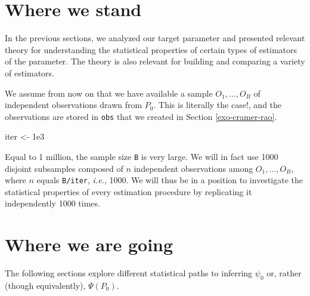 \documentclass[11pt,openright,twoside]{book}
\newenvironment{Shaded}{\begin{snugshade}}{\end{snugshade}}
\newcommand{\FloatTok}[1]{\textcolor[rgb]{0.00,0.00,0.81}{#1}}
\newcommand{\NormalTok}[1]{#1}
\newcommand{\StringTok}[1]{\textcolor[rgb]{0.31,0.60,0.02}{#1}}
\theoremstyle{definition}
\theoremstyle{definition}
\theoremstyle{definition}
\theoremstyle{remark}
\begin{document}
\hypertarget{where-we-stand}{%
\section{Where we stand}\label{where-we-stand}}

In the previous sections, we analyzed our target parameter and presented
relevant theory for understanding the statistical properties of certain types
of estimators of the parameter. The theory is also relevant for building and
comparing a variety of estimators.

We assume from now on that we have available a sample \(O_{1}, \ldots, O_{B}\)
of independent observations drawn from \(P_{0}\). This is literally the case!,
and the observations are stored in \texttt{obs} that we created in Section
\ref{exo-cramer-rao}.

\begin{Shaded}
\begin{Highlighting}[]
\NormalTok{iter <-}\StringTok{ }\FloatTok{1e3}
\end{Highlighting}
\end{Shaded}

Equal to 1 million, the sample size \texttt{B} is very large. We will in fact
use 1000 disjoint subsamples composed of \(n\) independent
observations among \(O_{1}, \ldots, O_{B}\), where \(n\) equals \texttt{B/iter}, \emph{i.e.},
1000. We will thus be in a position to investigate the
statistical properties of every estimation procedure by replicating it
independently 1000 times.

\hypertarget{where-we-are-going}{%
\section{Where we are going}\label{where-we-are-going}}

The following sections explore different statistical paths to inferring
\(\psi_{0}\) or, rather (though equivalently), \(\Psi(P_{0})\).
\end{document}

